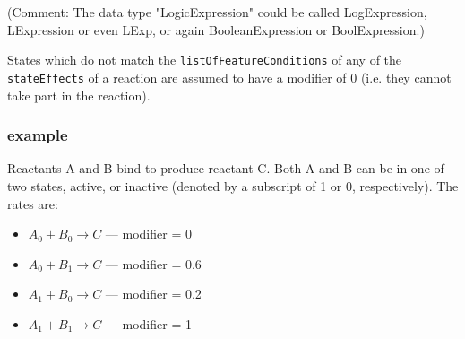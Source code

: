 \documentclass{cekarticle}
\begin{document}
(Comment: The data type "LogicExpression" could be called LogExpression,
LExpression or even LExp, or again BooleanExpression or BoolExpression.)

States which do not match the \texttt{listOfFeatureConditions} of any of the
\texttt{stateEffects} of a reaction are assumed to have a modifier of 0 (i.e.
they cannot take part in the reaction).

\subsubsection{example}

Reactants A and B bind to produce reactant C.  Both A and B can be in
one of two states, active, or inactive (denoted by a subscript of 1 or
0, respectively).  The rates are:

\begin{itemize}
\item $A_0 + B_0 \rightarrow C$   ---  modifier = 0
\item $A_0 + B_1 \rightarrow C$   ---  modifier = 0.6
\item $A_1 + B_0 \rightarrow C$   ---  modifier = 0.2
\item $A_1 + B_1 \rightarrow C$   ---  modifier = 1
\end{itemize}
\end{document}
